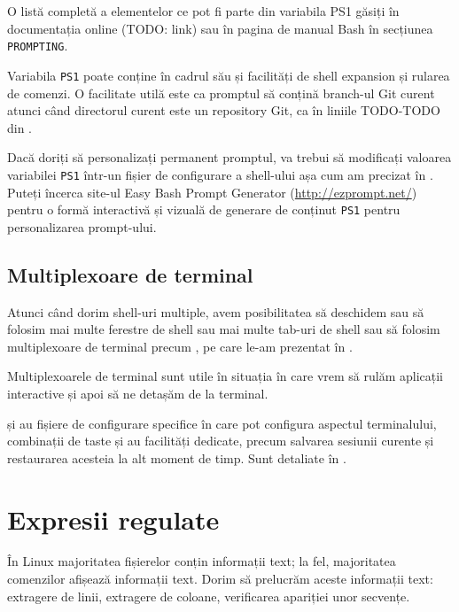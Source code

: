 O listă completă a elementelor ce pot fi parte din variabila PS1 găsiți în
documentația online (TODO: link) sau în pagina de manual Bash în secțiunea \texttt{PROMPTING}.

Variabila \texttt{PS1} poate conține în cadrul său și facilități de shell expansion și
rularea de comenzi. O facilitate utilă este ca promptul să conțină branch-ul Git
curent atunci când directorul curent este un repository Git, ca în liniile TODO-TODO din .

Dacă doriți să personalizați permanent promptul, va trebui să modificați valoarea
variabilei \texttt{PS1} într-un fișier de configurare a shell-ului așa cum am precizat în . Puteți încerca site-ul Easy Bash Prompt
Generator (\url{http://ezprompt.net/}) pentru o formă interactivă și vizuală de
generare de conținut \texttt{PS1} pentru personalizarea prompt-ului.

\subsection{Multiplexoare de terminal}
\label{sec:cli-tmux}

Atunci când dorim shell-uri multiple, avem posibilitatea să deschidem sau să
folosim mai multe ferestre de shell sau mai multe tab-uri de shell sau să
folosim multiplexoare de terminal precum ,  pe care le-am prezentat în
.

Multiplexoarele de terminal sunt utile în situația în care vrem să rulăm
aplicații interactive și apoi să ne detașăm de la terminal.

 și  au fișiere de configurare specifice în care pot configura
aspectul terminalului, combinații de taste și au facilități dedicate, precum
salvarea sesiunii curente și restaurarea acesteia la alt moment de timp. Sunt detaliate în .

\section{Expresii regulate}
\label{sec:cli-regex}

În Linux majoritatea fișierelor conțin informații text; la fel, majoritatea
comenzilor afișează informații text. Dorim să prelucrăm aceste informații text:
extragere de linii, extragere de coloane, verificarea apariției unor secvențe.

